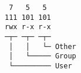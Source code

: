 \documentclass[varwidth,crop]{standalone}
\begin{document}
\begin{verbatim}
 7   5   5
111 101 101
rwx r-x r-x
─┬─ ─┬─ ─┬─
 │   │   └─ Other
 │   └───── Group
 └───────── User
\end{verbatim}
\end{document}
